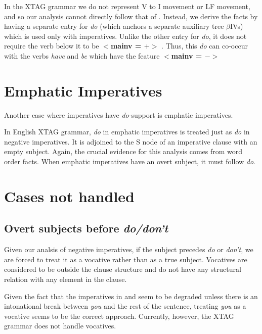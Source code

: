 In the XTAG grammar we do not represent V to I movement or LF movement, and so
our analysis cannot directly follow that of \cite{handiss}. Instead, we derive
the facts by having a separate entry for {\it do} (which anchors a separate
auxiliary tree $\beta$IVs) which is used only with imperatives. Unlike the
other entry for {\it do}, it does not require the verb below it to be {\bf
$<$mainv = $+>$ }. Thus, this {\it do} can co-occur with the verbs {\it have}
and {\it be} which have the feature {\bf $<$mainv = $->$ }

\section{Emphatic Imperatives}

Another case where imperatives have {\it do}-support is emphatic
imperatives.


In English XTAG grammar, {\it do} in emphatic imperatives is treated just as
{\it do} in negative imperatives.  It is adjoined to the S node of an
imperative clause with an empty subject.  Again, the crucial evidence for this
analysis comes from word order facts.  When emphatic imperatives have an overt
subject, it must follow {\it do}.


\section{Cases not handled}

\subsection{Overt subjects before {\it do/don't}}
\label{sec:vocative}

Given our analsis of negative imperatives, if the subject precedes {\it do}
or {\it don't}, we are forced to treat it as a vocative rather than as a true subject.  Vocatives are considered to be outside the clause
structure and do not have any structural relation with any element in the
clause.


Given the fact that the imperatives in  and  seem to be degraded
unless there is an intonational break between {\it you} and the rest of the
sentence, treating {\it you} as a vocative seems to be the correct approach.
Currently, however, the XTAG grammar does not handle vocatives.

